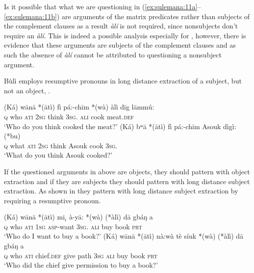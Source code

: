 \documentclass[output=paper,colorlinks,citecolor=brown]{langscibook}
\begin{document}
Is it possible that what we are questioning in (\ref{ex:sulemana:11a}--\ref{ex:sulemana:11b}) are arguments of the matrix predicates rather than subjects of the complement clauses as a result {\it{àlí}} is not required, since nonsubjects don't require an {\it{àlí}}. This is indeed a possible analysis especially for , however, there is evidence that these arguments are subjects of the complement clauses and as such the absence of {\it{àlí}} cannot be attributed to questioning a nonsubject argument. 

Bùlì employs resumptive pronouns in long distance extraction of a subject,  but not an object, .  

\ea%
    \label{ex:sulemana:12}
    \ea%
    \label{ex:sulemana:12a}
    \gll    (Ká) wānā *(ātì) fì pá:-chīm *(wà) àlì dīg lāmmú: \\
            \textsc{q} who \textsc{ati}   \textsc{2sg}  think   \textsc{3sg}.  \textsc{ali} cook  meat.\textsc{def}\\
    \glt    `Who do you think cooked the meat?'
    \ex%
    \label{ex:sulemana:12b}
    \gll    (Ká) bʷā *(ātì) fì pá:-chīm Asouk dìgì: (*bu)  \\
            \textsc{q} what \textsc{ati}  \textsc{2sg} think Asouk  cook   \textsc{3sg}. \\
    \glt    `What do you think Asouk cooked?'
    \z
\z

If the questioned arguments in  above are objects, they should pattern with object extraction and if they are subjects they should pattern with long distance subject extraction. As shown in  they pattern with long distance subject extraction by requiring a resumptive pronoun. 

\ea%
    \label{ex:sulemana:13}
    \ea%
    \label{ex:sulemana:13a}
    \gll    (Ká) wānā *(ātì) mi$_i$ à-yā: *(wà)  (*àlì) dā gbáŋ a \\
            \textsc{q} who \textsc{ati}   \textsc{1sg} \textsc{asp}-want \textsc{3sg}.   \textsc{ali}  buy book \textsc{prt} \\
    \glt    `Who do I want  to buy a book?'
    \ex%
    \label{ex:sulemana:13b}
    \gll    (Ká) wānā *(ātì) nà:wà tè síuk  *(wà) (*àlì) dā gbáŋ a \\
            \textsc{q} who \textsc{ati}  chief.\textsc{def} give path  \textsc{3sg} \textsc{ali} buy book \textsc{prt}\\
    \glt    `Who did the chief give permission to buy a book?'
    \z
\z
\end{document}
